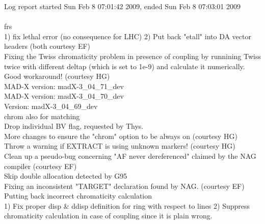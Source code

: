 Log report started Sun Feb  8 07:01:42 2009, ended Sun Feb  8 07:03:01 2009
\\
\\
frs \\ 
1) fix lethal error (no consequence for LHC) 2) Put back "etall" into DA vector headers  (both courtesy EF)  \\ 
Fixing the Twiss chromaticity problem in presence of coupling by runnining Twiss twice with different deltap (which is set to 1e-9) and calculate it numerically. Good workaround! (courtesy HG)  \\ 
MAD-X version: madX-3\_04\_71\_dev  \\ 
MAD-X version: madX-3\_04\_70\_dev  \\ 
Version: madX-3\_04\_69\_dev  \\ 
chrom also for matching  \\ 
Drop individual BV flag, requested by Thys.  \\ 
More changes to ensure the "chrom" option to be always on (courtesy HG)  \\ 
Throw a warning if EXTRACT is using unknown markers! (courtesy HG)  \\ 
Clean up a pseudo-bug concerning "AF never dereferenced" claimed by the NAG compiler (courtesy EF)  \\ 
Skip double allocation detected by G95  \\ 
Fixing an inconsistent "TARGET" declaration found by NAG. (courtesy EF)  \\ 
Putting back incorrect chromaticity calculation  \\ 
1) Fix proper disp \& ddisp definition for ring with respect to lines 2) Suppress chromaticity calculation in case of coupling since it is plain wrong. 


